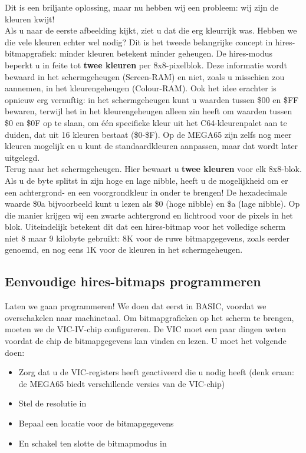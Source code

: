 Dit is een briljante oplossing, maar nu hebben wij een probleem: wij zijn de kleuren kwijt!\\

Als u naar de eerste afbeelding kijkt, ziet u dat die erg kleurrijk was. Hebben we die vele kleuren echter wel nodig? Dit is het tweede belangrijke concept in hires-bitmapgrafiek: minder kleuren betekent minder geheugen. De hires-modus beperkt u in feite tot \textbf{twee kleuren} per 8x8-pixelblok. Deze informatie wordt bewaard in het schermgeheugen (Screen-RAM) en niet, zoals u misschien zou aannemen, in het kleurengeheugen (Colour-RAM). Ook het idee erachter is opnieuw erg vernuftig: in het schermgeheugen kunt u waarden tussen \$00 en \$FF bewaren, terwijl het in het kleurengeheugen alleen zin heeft om waarden tussen \$0 en \$0F op te slaan, om één specifieke kleur uit het C64-kleurenpalet aan te duiden, dat uit 16 kleuren bestaat (\$0-\$F). Op de MEGA65 zijn zelfs nog meer kleuren mogelijk en u kunt de standaardkleuren aanpassen, maar dat wordt later uitgelegd.\\

Terug naar het schermgeheugen. Hier bewaart u \textbf{twee kleuren} voor elk 8x8-blok. Als u de byte splitst in zijn hoge en lage nibble, heeft u de mogelijkheid om er een achtergrond- en een voorgrondkleur in onder te brengen! De hexadecimale waarde \$0a bijvoorbeeld kunt u lezen als \$0 (hoge nibble) en \$a (lage nibble). Op die manier krijgen wij een zwarte achtergrond en lichtrood voor de pixels in het blok. Uiteindelijk betekent dit dat een hires-bitmap voor het volledige scherm niet 8 maar 9 kilobyte gebruikt: 8K voor de ruwe bitmapgegevens, zoals eerder genoemd, en nog eens 1K voor de kleuren in het schermgeheugen.\\

\subsection*{Eenvoudige hires-bitmaps programmeren}

Laten we gaan programmeren! We doen dat eerst in BASIC, voordat we overschakelen naar machinetaal. Om bitmapgrafieken op het scherm te brengen, moeten we de VIC-IV-chip configureren. De VIC moet een paar dingen weten voordat de chip de bitmapgegevens kan vinden en lezen. U moet het volgende doen:

\begin{itemize}
	\item Zorg dat u de VIC-registers heeft geactiveerd die u nodig heeft (denk eraan: de MEGA65 biedt verschillende versies van de VIC-chip)	\item Stel de resolutie in	\item Bepaal een locatie voor de bitmapgegevens	\item En schakel ten slotte de bitmapmodus in
\end{itemize}


